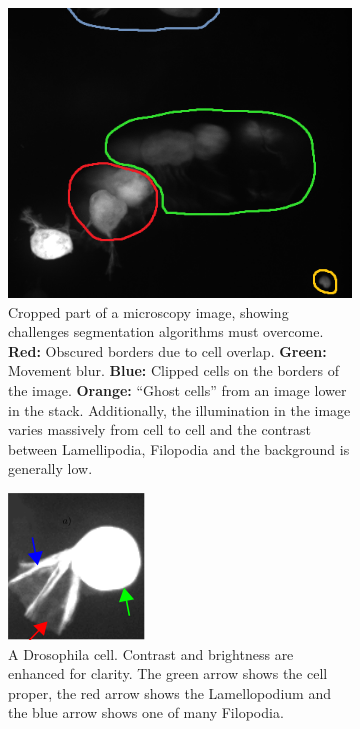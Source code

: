 \begin {figure}[!ht]	
	\centering
	\begin {subfigure}[t]{0.52\linewidth}
		\includegraphics[scale=0.60]{img/fig_problems.png}

		\caption*{Cropped part of a microscopy image, showing challenges segmentation algorithms must overcome. \textbf{Red:} Obscured borders due to cell overlap. \textbf{Green:} Movement blur. \textbf{Blue:} Clipped cells on the borders of the image. \textbf{Orange:} ``Ghost cells'' from an image lower in the stack. Additionally, the illumination in the image varies massively from cell to cell and the contrast between Lamellipodia, Filopodia and the background is generally low.}
	\end {subfigure}
	\hspace{1cm}
	\begin {subfigure}[t]{0.35\linewidth}
		\includegraphics[scale=1.0]{img/fig_cell_example.png}

		\caption*{A Drosophila cell. Contrast and brightness are enhanced for clarity. The green arrow shows the cell proper, the red arrow shows the Lamellopodium and the blue arrow shows one of many Filopodia.}
	\end {subfigure}

	\caption[Segmentation challenges and cell parts.]{}
	\label{fig:cell_example}
\end {figure}

